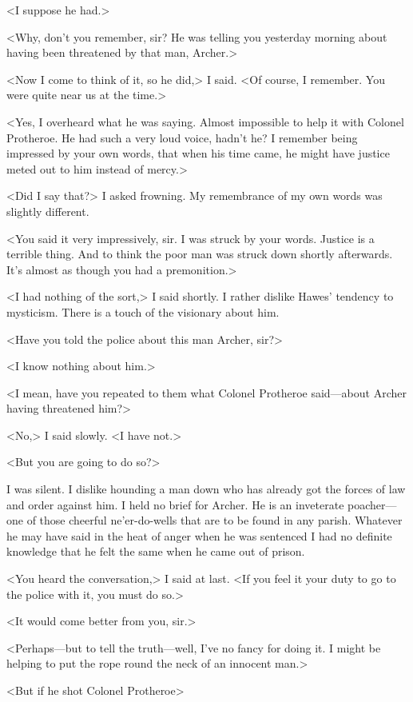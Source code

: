 <I suppose he had.>

<Why, don't you remember, sir? He was telling you yesterday morning about having been threatened by that man, Archer.>

<Now I come to think of it, so he did,> I said. <Of course, I remember. You were quite near us at the time.>

<Yes, I overheard what he was saying. Almost impossible to help it with Colonel Protheroe. He had such a very loud voice, hadn't he? I remember being impressed by your own words, that when his time came, he might have justice meted out to him instead of mercy.>

<Did I say that?> I asked frowning. My remembrance of my own words was slightly different.

<You said it very impressively, sir. I was struck by your words. Justice is a terrible thing. And to think the poor man was struck down shortly afterwards. It's almost as though you had a premonition.>

<I had nothing of the sort,> I said shortly. I rather dislike Hawes' tendency to mysticism. There is a touch of the visionary about him.

<Have you told the police about this man Archer, sir?>

<I know nothing about him.>

<I mean, have you repeated to them what Colonel Protheroe said—about Archer having threatened him?>

<No,> I said slowly. <I have not.>

<But you are going to do so?>

I was silent. I dislike hounding a man down who has already got the forces of law and order against him. I held no brief for Archer. He is an inveterate poacher—one of those cheerful ne'er-do-wells that are to be found in any parish. Whatever he may have said in the heat of anger when he was sentenced I had no definite knowledge that he felt the same when he came out of prison.

<You heard the conversation,> I said at last. <If you feel it your duty to go to the police with it, you must do so.>

<It would come better from you, sir.>

<Perhaps—but to tell the truth—well, I've no fancy for doing it. I might be helping to put the rope round the neck of an innocent man.>

<But if he shot Colonel Protheroe\longdash>

